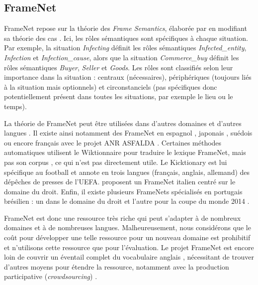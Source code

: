 \subsection{FrameNet}
\label{presentation_framenet}

FrameNet \citep{baker1998berkeley} repose sur la théorie des \textit{Frame
Semantics}, élaborée par \cite{fillmore1982frame} en modifiant sa théorie des
cas \citep{fillmore1968case}. Ici, les rôles sémantiques sont spécifiques à
chaque situation. Par exemple, la situation \emph{Infecting} définit les rôles
sémantiques \emph{Infected\_entity}, \emph{Infection} et
\emph{Infection\_cause}, alors que la situation \emph{Commerce\_buy} définit les
rôles sémantiques \emph{Buyer}, \emph{Seller} et \emph{Goods}. Les rôles sont
classifiés selon leur importance dans la situation : centraux (nécessaires),
périphériques (toujours liés à la situation mais optionnels) et circonstanciels
(pas spécifiques donc potentiellement présent dans toutes les situations, par
exemple le lieu ou le temps).

La théorie de FrameNet peut être utilisées dans d'autres domaines et d'autres
langues \citep{boas2009multilingual}. Il existe ainsi notamment des FrameNet en
espagnol \citep{subirats2003surprise}, japonais \citep{ohara2004japanese},
suédois \citep{heppin2012rocky} ou encore français avec le projet ANR ASFALDA
\citep{candito2014developing}. Certaines méthodes automatiques utilisent le
Wiktionnaire pour traduire le lexique FrameNet, mais pas son corpus
\citep{mouton2010framenet,hartmann2013framenet}, ce qui n'est pas directement
utile. Le Kicktionary \citep{schmidt2009kicktionary} est lui spécifique au
football et annote en trois langues (français, anglais, allemand) des dépêches
de presses de l'UEFA.  \cite{venturi2009towards} proposent un FrameNet italien
centré sur le domaine du droit. Enfin, il existe plusieurs FrameNets
spécialisés en portugais brésilien : un dans le domaine du droit
\citep{bertoldi2012frame} et l'autre pour la coupe du monde 2014
\citep{torrent2014copa}.

FrameNet est donc une ressource très riche qui peut s'adapter à de nombreux
domaines et à de nombreuses langues. Malheureusement, nous considérons que le
coût pour développer une telle ressource pour un nouveau domaine est prohibitif
et n'utilisons cette ressource que pour l'évaluation. Le projet FrameNet est
encore loin de couvrir un éventail complet du vocabulaire anglais
\citep[§5.4]{marquez2008semantic}, nécessitant de trouver d'autres moyens pour
étendre la ressource, notamment avec la production participative
(\emph{crowdsourcing}) \citep{fossati2013outsourcing,baker2014framenet}.


